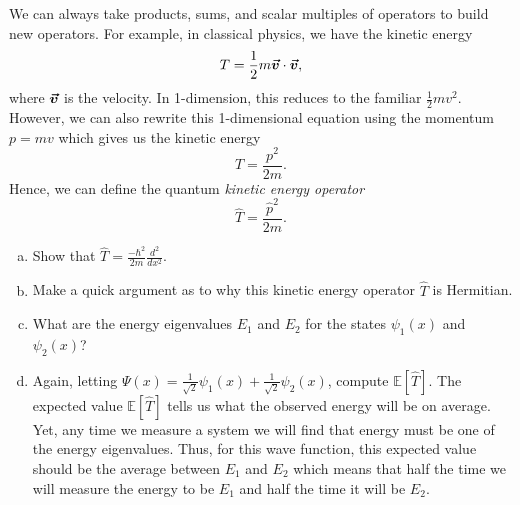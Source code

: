\documentclass[12pt]{article} %
\begin{document}
\newpage
\begin{problem}
	We can always take products, sums, and scalar multiples of operators to build new operators.  For example, in classical physics, we have the kinetic energy
	\[
	T=\frac{1}{2}m \boldsymbol{\vec{v}} \cdot \boldsymbol{\vec{v}},
	\]
	where $\boldsymbol{\vec{v}}$ is the velocity. In 1-dimension, this reduces to the familiar $\frac{1}{2}mv^2$.  However, we can also rewrite this 1-dimensional equation using the momentum $p=mv$ which gives us the kinetic energy
	\[
	T=\frac{p^2}{2m}.
	\]
	Hence, we can define the quantum \emph{kinetic energy operator}
	\[
	\hat{T}=\frac{\hat{p}^2}{2m}.
	\]
	\begin{enumerate}[(a)]
		\item Show that $\hat{T} = \frac{-\hbar^2}{2m}\frac{d^2}{dx^2}$.
		\item Make a quick argument as to why this kinetic energy operator $\hat{T}$ is Hermitian.
		\item What are the energy eigenvalues $E_1$ and $E_2$ for the states $\psi_1(x)$ and $\psi_2(x)$?
		\item Again, letting $\Psi(x)=\frac{1}{\sqrt{2}}\psi_1(x)+\frac{1}{\sqrt{2}}\psi_2(x)$, compute $\mathbb{E}[\hat{T}]$. The expected value $\mathbb{E}[\hat{T}]$ tells us what the observed energy will be on average. Yet, any time we measure a system we will find that energy must be one of the energy eigenvalues. Thus, for this wave function, this expected value should be the average between $E_1$ and $E_2$ which means that half the time we will measure the energy to be $E_1$ and half the time it will be $E_2$.
	\end{enumerate}	
\end{problem}
\end{document}
